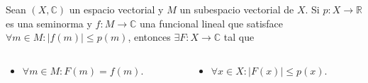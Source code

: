 \begin{exampletwoup}
\begin{theorem}
Sean $\left(X,\mathbb{C}\right)$ un espacio vectorial y $M$ un
subespacio vectorial de $X$.
Si $p\colon X\to\mathbb{R}$ es una seminorma y
$f\colon M\to\mathbb{C}$ una funcional lineal que satisface
$\forall m\in M:\left|f\left(m\right)\right|\leq p\left(m\right)$,
entonces $\exists F\colon X\to\mathbb{C}$ tal que
\begin{columns}
\begin{column}{.4\paperwidth}
\begin{itemize}
\item

$\forall m\in M: F\left(m\right)=f\left(m\right)$.
\end{itemize}
\end{column}
\begin{column}{.4\paperwidth}
\begin{itemize}
\item

$\forall x\in X: \left|F\left(x\right)\right|\leq p\left(x\right)$.
\end{itemize}
\end{column}
\end{columns}
\end{theorem}
\end{exampletwoup}
